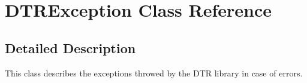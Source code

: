 \hypertarget{class_d_t_r_1_1_d_t_r_exception}{\section{D\-T\-R\-Exception Class Reference}
\label{class_d_t_r_1_1_d_t_r_exception}
}


\subsection{Detailed Description}
This class describes the exceptions throwed by the D\-T\-R library in case of errors. 